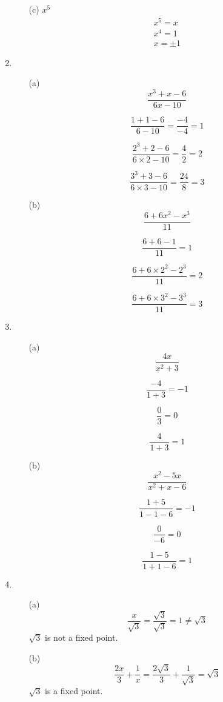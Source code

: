 \documentclass[UTF8]{ctexart}
\begin{document}
\begin{enumerate}
\begin{itemize}
\item[(c)] $x^5$
\begin{gather*}
x^5 = x \\
x^4 = 1 \\
x = \pm 1
\end{gather*}

\end{itemize}

\item \begin{itemize}
\item[(a)]
\[
\frac{x^3 + x - 6}{6x - 10}
\]

\[
\frac{1 + 1 - 6}{6 - 10} = \frac{-4}{-4} = 1
\]

\[
\frac{2^3 + 2 - 6}{6\times2 - 10} = \frac{4}{2} = 2
\]

\[
\frac{3^3 + 3 - 6}{6\times3 - 10} = \frac{24}{8} = 3
\]

\item[(b)]
\[
	\frac{6 + 6x^2 - x^3}{11}
\]

\[
	\frac{6 + 6 - 1}{11} = 1
\]

\[
	\frac{6 + 6 \times 2^2 - 2^3}{11} = 2
\]

\[
	\frac{6 + 6 \times 3^2 - 3^3}{11} = 3
\]

\end{itemize}

\item \begin{itemize}
\item[(a)]
\[
	\frac{4x}{x^2 + 3}
\]

\[
	\frac{-4}{1 + 3} = -1
\]

\[
	\frac{0}{3} = 0
\]

\[
	\frac{4}{1 + 3} = 1
\]

\item[(b)]
\[
	\frac{x^2 - 5x}{x^2 + x - 6}
\]

\[
	\frac{1 + 5}{1 - 1 - 6} = -1
\]

\[
	\frac{0}{-6} = 0
\]

\[
	\frac{1 - 5}{1 + 1 - 6} = 1
\]

\end{itemize}

\item \begin{itemize}
\item[(a)]
\[
	\frac{x}{\sqrt{3}} = \frac{\sqrt{3}}{\sqrt{3}} = 1 \ne \sqrt{3}
\]
$\sqrt{3}$ is not a fixed point.

\item[(b)]
\[
	\frac{2x}{3} + \frac{1}{x} = \frac{2\sqrt{3}}{3} + \frac{1}{\sqrt{3}} = \sqrt{3}
\]
$\sqrt{3}$ is a fixed point.


\end{itemize}
\end{enumerate}
\end{document}

